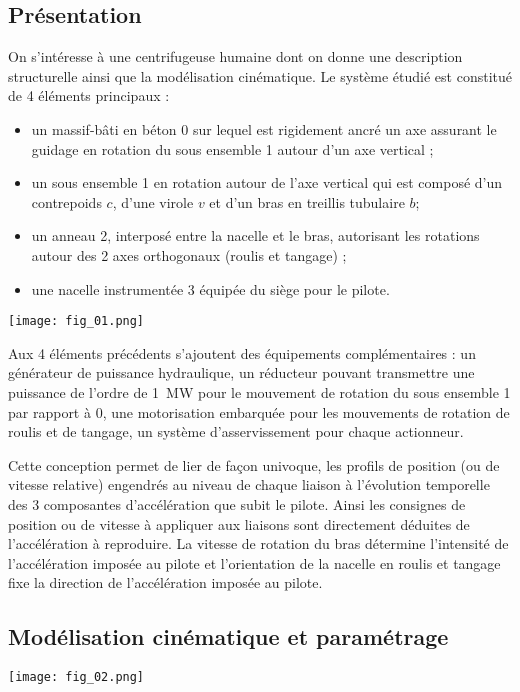 \begin{multicols}{2}

\subsection*{Présentation}

On s’intéresse à une centrifugeuse humaine dont on donne une description structurelle ainsi que la
modélisation cinématique.
Le système étudié est constitué de 4 éléments principaux :
\begin{itemize}
\item un massif-bâti en béton 0 sur lequel est rigidement ancré un axe assurant le guidage en rotation du sous ensemble 1
autour d’un axe vertical ;
\item un sous ensemble 1 en rotation autour de l’axe vertical qui est composé d’un contrepoids $c$, d’une virole $v$ et d’un bras en treillis tubulaire $b$;
\item un anneau 2, interposé entre la nacelle et le bras, autorisant les rotations autour des 2 axes orthogonaux (roulis et tangage) ;
\item une nacelle instrumentée 3 équipée du siège pour le pilote.
\end{itemize}

\begin{center}
\texttt{[image: fig\_01.png]}
\end{center}

Aux 4 éléments précédents s’ajoutent des équipements complémentaires : un générateur de puissance
hydraulique, un réducteur pouvant transmettre une puissance de l’ordre de \SI{1}{MW} pour le mouvement de
rotation du sous ensemble 1 par rapport à 0, une motorisation embarquée pour les mouvements de rotation
de roulis et de tangage, un système d’asservissement pour chaque actionneur.

Cette conception permet de lier de façon univoque, les profils de position (ou de vitesse relative) engendrés
au niveau de chaque liaison à l’évolution temporelle des 3 composantes d’accélération que subit le pilote.
Ainsi les consignes de position ou de vitesse à appliquer aux liaisons sont directement déduites de
l’accélération à reproduire. La vitesse de rotation du bras détermine l’intensité de l’accélération imposée au
pilote et l’orientation de la nacelle en roulis et tangage fixe la direction de l’accélération imposée au pilote.

\subsection*{Modélisation cinématique et paramétrage}
\begin{center}
\texttt{[image: fig\_02.png]}
\end{center}


\end{multicols}
